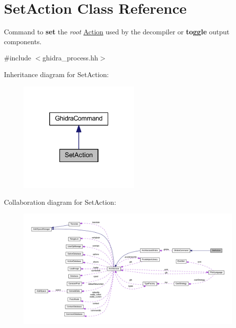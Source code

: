 \hypertarget{class_set_action}{}\section{Set\+Action Class Reference}
\label{class_set_action}


Command to {\bfseries{set}} the {\itshape root} \mbox{\hyperlink{class_action}{Action}} used by the decompiler or {\bfseries{toggle}} output components.  




{\ttfamily \#include $<$ghidra\+\_\+process.\+hh$>$}



Inheritance diagram for Set\+Action\+:
\nopagebreak
\begin{figure}[H]
\begin{center}
\leavevmode
\includegraphics[width=169pt]{class_set_action__inherit__graph}
\end{center}
\end{figure}


Collaboration diagram for Set\+Action\+:
\nopagebreak
\begin{figure}[H]
\begin{center}
\leavevmode
\includegraphics[width=350pt]{class_set_action__coll__graph}
\end{center}
\end{figure}

